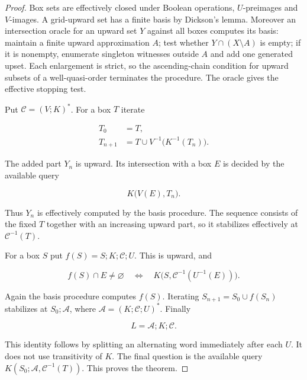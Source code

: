 \documentclass[11pt,a4paper]{article}
\theoremstyle{remark}
\begin{document}
\begin{proof}

Box sets are effectively closed under Boolean operations, \(U\)-preimages and \(V\)-images. A grid-upward set has a finite basis by Dickson's lemma. Moreover an intersection oracle for an upward set \(Y\) against all boxes computes its basis: maintain a finite upward approximation \(A\); test whether \(Y\cap(X\setminus A)\) is empty; if it is nonempty, enumerate singleton witnesses outside \(A\) and add one generated upset. Each enlargement is strict, so the ascending-chain condition for upward subsets of a well-quasi-order terminates the procedure. The oracle gives the effective stopping test.

Put \(\mathcal C=(V;K)^*\). For a box \(T\) iterate

\begin{equation}
\begin{aligned}T_0&=T,\\ T_{n+1}&=T\cup V^{-1}\bigl(K^{-1}(T_n)\bigr).\end{aligned}\label{eq:backward}
\end{equation}


The added part \(Y_n\) is upward. Its intersection with a box \(E\) is decided by the available query

\begin{equation*}
K\bigl(V(E),T_n\bigr).
\end{equation*}


Thus \(Y_n\) is effectively computed by the basis procedure. The sequence consists of the fixed \(T\) together with an increasing upward part, so it stabilizes effectively at \(\mathcal C^{-1}(T)\).

For a box \(S\) put \(f(S)=S;K;\mathcal C;U\). This is upward, and

\begin{equation}
f(S)\cap E\neq\varnothing\quad\Longleftrightarrow\quad K\bigl(S,\mathcal C^{-1}(U^{-1}(E))\bigr). \label{eq:forward-query}
\end{equation}


Again the basis procedure computes \(f(S)\). Iterating \(S_{n+1}=S_0\cup f(S_n)\) stabilizes at \(S_0;\mathcal A\), where \(\mathcal A=(K;\mathcal C;U)^*\). Finally

\begin{equation}
L=\mathcal A;K;\mathcal C. \label{eq:factorization}
\end{equation}


This identity follows by splitting an alternating word immediately after each \(U\). It does not use transitivity of \(K\). The final question is the available query \(K(S_0;\mathcal A,\mathcal C^{-1}(T))\). This proves the theorem.

\end{proof}
\end{document}
